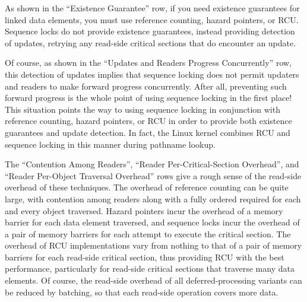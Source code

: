 As shown in the ``Existence Guarantee'' row,
if you need existence guarantees for linked
data elements, you must use reference counting, hazard pointers, or RCU\@.
Sequence locks do not provide existence guarantees, instead providing
detection of updates, retrying any read-side critical sections
that do encounter an update.

Of course, as shown in the ``Updates and Readers Progress Concurrently''
row, this detection of updates implies
that sequence locking does not permit updaters and readers to make forward
progress concurrently.
After all, preventing such forward progress is the whole point of using
sequence locking in the first place!
This situation points the way to using sequence locking in conjunction
with reference counting, hazard pointers, or RCU in order to provide
both existence guarantees and update detection.
In fact, the Linux kernel combines RCU and sequence locking in
this manner during pathname lookup.

The ``Contention Among Readers'', ``Reader Per-Critical-Section Overhead'',
and ``Reader Per-Object Traversal Overhead'' rows give a rough sense of
the read-side overhead of these techniques.
The overhead of reference counting can be quite large, with
contention among readers along with a fully ordered
required for each and every object traversed.
Hazard pointers incur the overhead of a memory barrier for each data element
traversed, and sequence locks incur the overhead of a pair of memory barriers
for each attempt to execute the critical section.
The overhead of RCU implementations vary from nothing to that of a pair of
memory barriers for each read-side critical section, thus providing RCU
with the best performance, particularly for read-side critical sections
that traverse many data elements.
Of course, the read-side overhead of all deferred-processing variants can
be reduced by batching, so that each read-side operation covers more data.

\QuickQuizEnd

